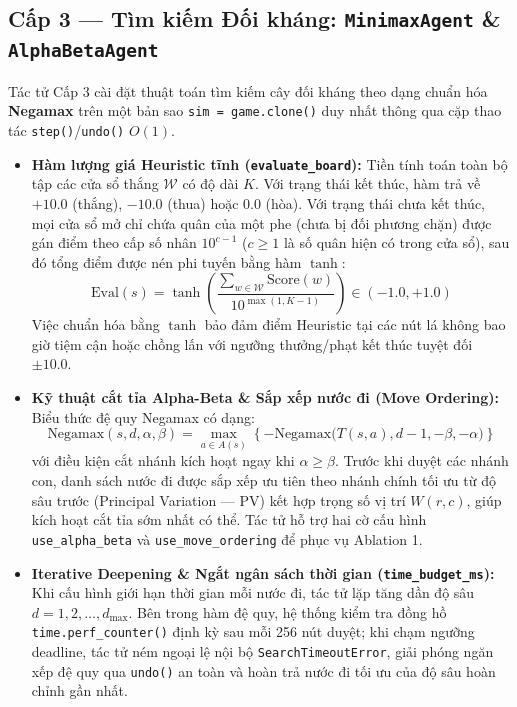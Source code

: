\documentclass[a4paper,12pt]{report}
\begin{document}
\subsection{Cấp 3 --- Tìm kiếm Đối kháng: \texttt{MinimaxAgent} \& \texttt{AlphaBetaAgent}}
Tác tử Cấp 3 cài đặt thuật toán tìm kiếm cây đối kháng theo dạng chuẩn hóa \textbf{Negamax} trên một bản sao \texttt{sim = game.clone()} duy nhất thông qua cặp thao tác \texttt{step()}/\texttt{undo()} $O(1)$.

\begin{itemize}[leftmargin=1.2cm]
    \item \textbf{Hàm lượng giá Heuristic tĩnh (\texttt{evaluate\_\allowbreak board}):} Tiền tính toán toàn bộ tập các cửa sổ thắng $\mathcal{W}$ có độ dài $K$. Với trạng thái kết thúc, hàm trả về $+10.0$ (thắng), $-10.0$ (thua) hoặc $0.0$ (hòa). Với trạng thái chưa kết thúc, mọi cửa sổ mở chỉ chứa quân của một phe (chưa bị đối phương chặn) được gán điểm theo cấp số nhân $10^{c - 1}$ ($c \ge 1$ là số quân hiện có trong cửa sổ), sau đó tổng điểm được nén phi tuyến bằng hàm $\tanh$:
    \begin{equation}
        \text{Eval}(s) = \tanh \left( \frac{\sum_{w \in \mathcal{W}} \text{Score}(w)}{10^{\max(1, K - 1)}} \right) \in (-1.0, +1.0)
    \end{equation}
    Việc chuẩn hóa bằng $\tanh$ bảo đảm điểm Heuristic tại các nút lá không bao giờ tiệm cận hoặc chồng lấn với ngưỡng thưởng/phạt kết thúc tuyệt đối $\pm 10.0$.
    \item \textbf{Kỹ thuật cắt tỉa Alpha-Beta \& Sắp xếp nước đi (Move Ordering):} Biểu thức đệ quy Negamax có dạng:
    \begin{equation}
        \text{Negamax}(s, d, \alpha, \beta) = \max_{a \in A(s)} \left\{ -\text{Negamax}\big(T(s, a), d - 1, -\beta, -\alpha\big) \right\}
    \end{equation}
    với điều kiện cắt nhánh kích hoạt ngay khi $\alpha \ge \beta$. Trước khi duyệt các nhánh con, danh sách nước đi được sắp xếp ưu tiên theo nhánh chính tối ưu từ độ sâu trước (Principal Variation --- PV) kết hợp trọng số vị trí $W(r, c)$, giúp kích hoạt cắt tỉa sớm nhất có thể. Tác tử hỗ trợ hai cờ cấu hình \texttt{use\_\allowbreak alpha\_\allowbreak beta} và \texttt{use\_\allowbreak move\_\allowbreak ordering} để phục vụ Ablation 1.
    \item \textbf{Iterative Deepening \& Ngắt ngân sách thời gian (\texttt{time\_\allowbreak budget\_\allowbreak ms}):} Khi cấu hình giới hạn thời gian mỗi nước đi, tác tử lặp tăng dần độ sâu $d = 1, 2, \dots, d_{\max}$. Bên trong hàm đệ quy, hệ thống kiểm tra đồng hồ \texttt{time.\allowbreak perf\_\allowbreak counter()} định kỳ sau mỗi 256 nút duyệt; khi chạm ngưỡng deadline, tác tử ném ngoại lệ nội bộ \texttt{SearchTimeoutError}, giải phóng ngăn xếp đệ quy qua \texttt{undo()} an toàn và hoàn trả nước đi tối ưu của độ sâu hoàn chỉnh gần nhất.
\end{itemize}
\end{document}
